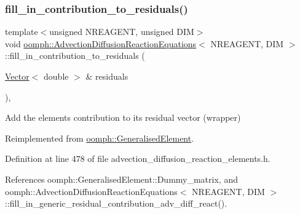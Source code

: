 \subsubsection{\texorpdfstring{fill\+\_\+in\+\_\+contribution\+\_\+to\+\_\+residuals()}{fill\_in\_contribution\_to\_residuals()}}
{\footnotesize\ttfamily template$<$unsigned N\+R\+E\+A\+G\+E\+NT, unsigned D\+IM$>$ \\
void \hyperlink{classoomph_1_1AdvectionDiffusionReactionEquations}{oomph\+::\+Advection\+Diffusion\+Reaction\+Equations}$<$ N\+R\+E\+A\+G\+E\+NT, D\+IM $>$\+::fill\+\_\+in\+\_\+contribution\+\_\+to\+\_\+residuals (\begin{DoxyParamCaption}\item[{\hyperlink{classoomph_1_1Vector}{Vector}$<$ double $>$ \&}]{residuals }\end{DoxyParamCaption})\hspace{0.3cm}{\ttfamily [inline]}, {\ttfamily [virtual]}}



Add the element\textquotesingle{}s contribution to its residual vector (wrapper) 



Reimplemented from \hyperlink{classoomph_1_1GeneralisedElement_a310c97f515e8504a48179c0e72c550d7}{oomph\+::\+Generalised\+Element}.



Definition at line 478 of file advection\+\_\+diffusion\+\_\+reaction\+\_\+elements.\+h.



References oomph\+::\+Generalised\+Element\+::\+Dummy\+\_\+matrix, and oomph\+::\+Advection\+Diffusion\+Reaction\+Equations$<$ N\+R\+E\+A\+G\+E\+N\+T, D\+I\+M $>$\+::fill\+\_\+in\+\_\+generic\+\_\+residual\+\_\+contribution\+\_\+adv\+\_\+diff\+\_\+react().

\mbox{\label{classoomph_1_1AdvectionDiffusionReactionEquations_a66d61f635f3d733b5e70de9552cdaf6b}} 
